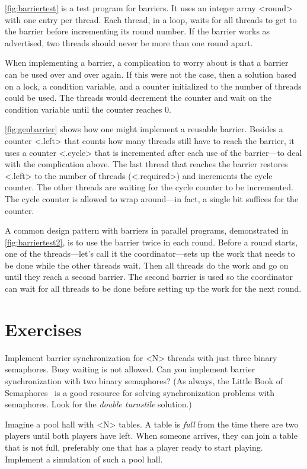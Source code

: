 \documentclass{report}
\begin{document}
\autoref{fig:barriertest} is a test program for barriers.
It uses an integer array <{round}> with one entry per thread.
Each thread, in a loop, waits for all threads to get to the barrier
before incrementing its round number.  If the barrier works as
advertised, two threads should never be more than one round apart.

When implementing a barrier, a complication to worry about is that
a barrier can be used over and over again.  If this were not the
case, then a solution based on a lock, a condition variable,
and a counter initialized to the number of threads could be used.
The threads would decrement the counter and wait on the condition
variable until the counter reaches 0.

\autoref{fig:genbarrier} shows how one might implement a reusable barrier.
Besides a counter <{.left}> that counts how many threads still have to
reach the barrier, it uses a counter <{.cycle}> that is incremented
after each use of the barrier---to deal with the complication above.
The last thread that reaches the barrier restores
<{.left}> to the number of threads
(<{.required}>) and increments the cycle counter.
The other threads are waiting for the cycle counter to be incremented.
The cycle counter is allowed to wrap around---in fact, a single bit
suffices for the counter.

A common design pattern with barriers in parallel programs,
demonstrated in \autoref{fig:barriertest2}, is to use the barrier
twice in each round.  Before a round starts, one of the threads---let's
call it the coordinator---sets up the work that needs to be done
while the other threads wait.  Then all threads do the work and go
on until they reach a second barrier.  The second barrier is used
so the coordinator can wait for all threads to be done before setting
up the work for the next round.

\section*{Exercises}
\begin{problems}
\item Implement barrier synchronization for <{N}> threads
with just three binary semaphores.  Busy waiting is not allowed.
Can you implement barrier synchronization with two binary semaphores?
(As always, the Little Book of Semaphores~\cite{Downey09} is a good resource
for solving synchronization problems with semaphores.
Look for the \emph{double turnstile}
%
solution.)
\item Imagine a pool hall with <{N}> tables.  A table is \emph{full}
from the time there are two players until both players have left.
When someone arrives, they can join a table that is not full, preferably
one that has a player ready to start playing.
Implement a simulation of such a pool hall.
\end{problems}
\end{document}
